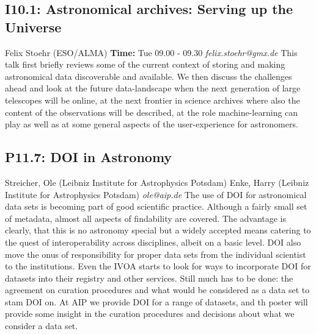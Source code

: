 \documentclass{report}
\begin{document}
\subsection*{I10.1: Astronomical archives: Serving up the Universe}
\bigskip
Felix Stoehr (ESO/ALMA) \newline   \newline   \newline   \newline  \newline  \newline\newline
{\bf Time:} Tue 09.00 - 09.30\newline
\newline
{\it felix.stoehr@gmx.de}\newline
\newline\newline
This talk first briefly reviews some of the current context of storing and making astronomical data discoverable and available. We then discuss the challenges ahead and look at the future data-landscape when the next generation of large telescopes will be online, at the next frontier in science archives where also the content of the observations will be described, at the role machine-learning can play as well as at some general aspects of the user-experience for astronomers.\newline
\newpage
\subsection*{P11.7: DOI in Astronomy}
\bigskip
Streicher, Ole (Leibniz Institute for Astrophysics Potsdam) \newline Enke, Harry (Leibniz Institute for Astrophysics Potsdam) \newline   \newline   \newline  \newline  \newline\newline
{\it ole@aip.de}\newline
\newline\newline
The use of DOI for astronomical data sets is becoming part of good scientific practice. Although a fairly small set of metadata, almost all aspects of findability are covered. The advantage is clearly, that this is no astronomy special but a widely accepted means catering to the quest of interoperability across disciplines, albeit on a basic level. DOI also move the onus of responsibility for proper data sets from the individual scientist to the institutions. Even the IVOA starts to look for ways to incorporate DOI for datasets into their registry and other services.
Still much has to be done: the agreement on curation procedures and what would be
considered as a data set to stam DOI on. At AIP we provide DOI for a range of datasets, and th poster will provide some insight in the curation procedures and decisions about what we consider a data set.\newline
\newpage
\end{document}
